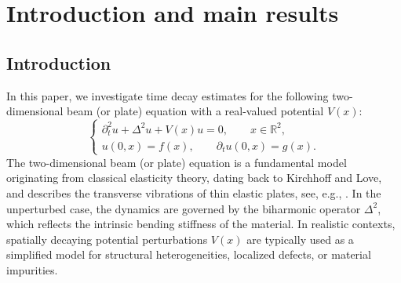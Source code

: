 \documentclass[reqno]{amsart}
\numberwithin{equation}{section}
\begin{document}
	\maketitle
	\tableofcontents
	\section{Introduction and main results}
	\subsection{Introduction}	In this paper, we investigate time decay estimates for the following
two-dimensional beam (or plate) equation with a real-valued potential
$V(x)$:
\begin{equation}\label{beam_equation}
\begin{cases}
\partial_t^2u+\Delta^2u+V(x)u=0, \qquad x\in\mathbb R^2,\\
u(0,x)=f(x), \qquad \partial_tu(0,x)=g(x).
\end{cases}
\end{equation}
The two-dimensional beam (or plate) equation is a fundamental model
originating from classical elasticity theory, dating back to
Kirchhoff and Love, and describes the transverse vibrations of thin
elastic plates, see, e.g., 
\cite{Kirchhoff1850,Love1927,TimoshenkoWoinowskyKrieger1959}. In the
unperturbed case, the dynamics are governed by the biharmonic
operator $\Delta^2$, which reflects the intrinsic bending stiffness
of the material. In realistic contexts, spatially decaying potential
perturbations $V(x)$ are typically used as a simplified model for
structural heterogeneities, localized defects, or material
impurities.
\end{document}
